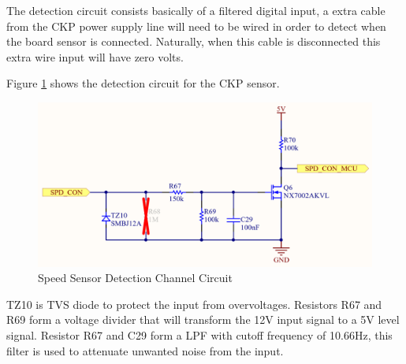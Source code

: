 		The detection circuit consists basically of a filtered digital input, a extra cable from the CKP power supply line will need to be wired in order to detect when the board sensor is connected. Naturally, when this cable is disconnected this extra wire input will have zero volts.

		Figure \ref{fig:ckp-detection-circuit} shows the detection circuit for the CKP sensor.

			\begin{figure}[htbp]
				\centering
					\includegraphics[scale=0.6]{figuras/fig-ckp-detection-circuit.png}
				\caption{Speed Sensor Detection Channel Circuit \cite{ckp-detection-circuit}}
				\label{fig:ckp-detection-circuit}
			\end{figure}

		TZ10 is TVS diode to protect the input from overvoltages. Resistors R67 and R69 form a voltage divider that will transform the 12V input signal to a 5V level signal. Resistor R67 and C29 form a LPF with cutoff frequency of 10.66Hz, this filter is used to attenuate unwanted noise from the input.